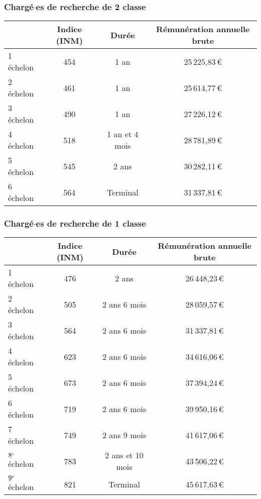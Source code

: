 \subsubsection*{Charg\'e$\cdot$es de recherche de 2\ieme{} classe}
\begin{center}
\begin{tabular}{lccc}
\toprule
& Indice (INM)& Dur\'ee& R\'emun\'eration annuelle brute \\
\midrule

1\ier{} \'echelon &454&1 an& 25\,225,83\,\euro{} \\

2\ieme{} \'echelon &461&1 an& 25\,614,77\,\euro{}\\

3\ieme{} \'echelon &490&1 an & 27\,226,12\,\euro{}\\

4\ieme{} \'echelon &518&1 an et 4 mois&28\,781,89\,\euro{}\\

5\ieme{} \'echelon &545&2 ans & 30\,282,11\,\euro{}\\

6\ieme{} \'echelon &564&Terminal&31\,337,81\,\euro{}\\
\bottomrule
\end{tabular}
\end{center}

\subsubsection*{Charg\'e$\cdot$es de recherche de 1\iere{} classe}
\begin{center}
\begin{tabular}{lccc}
\toprule
& Indice (INM)& Dur\'ee& R\'emun\'eration annuelle brute \\
\midrule
1\ier{} \'echelon &476&2 ans& 26\,448,23\,\euro{}\\

2\ieme{} \'echelon &505&2 ans 6 mois&28\,059,57\,\euro{}\\

3\ieme{} \'echelon &564& 2 ans 6 mois&31\,337,81\,\euro{}\\

4\ieme{} \'echelon & 623 &2 ans 6 mois&34\,616,06\,\euro{}\\

5\ieme{} \'echelon & 673& 2 ans 6 mois&37\,394,24\,\euro{}\\

6\ieme{} \'echelon &719&2 ans 6 mois&39\,950,16\,\euro{}\\

7\ieme{} \'echelon &749&2 ans 9 mois&41\,617,06\,\euro{}\\

$8^{\mbox{\tiny e}}$ \'echelon &783&2 ans et 10 mois&43\,506,22\,\euro{}\\

$9^{\mbox{\tiny e}}$ \'echelon &821&Terminal&45\,617,63\,\euro{}\\
\bottomrule
\end{tabular}
\end{center}

